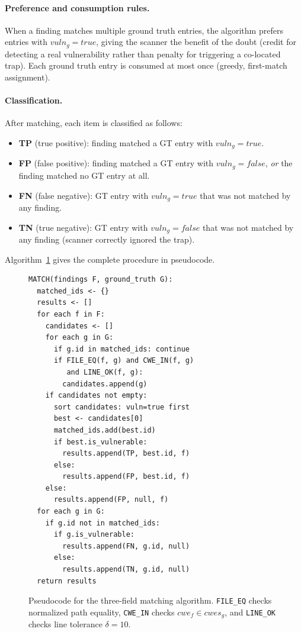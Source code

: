 \paragraph{Preference and consumption rules.}
When a finding matches multiple ground truth entries, the algorithm prefers entries with $\mathit{vuln}_g = \mathit{true}$, giving the scanner the benefit of the doubt (credit for detecting a real vulnerability rather than penalty for triggering a co-located trap).
Each ground truth entry is consumed at most once (greedy, first-match assignment).

\paragraph{Classification.}
After matching, each item is classified as follows:
\begin{itemize}
  \item \textbf{TP} (true positive): finding matched a GT entry with $\mathit{vuln}_g = \mathit{true}$.
  \item \textbf{FP} (false positive): finding matched a GT entry with $\mathit{vuln}_g = \mathit{false}$, \emph{or} the finding matched no GT entry at all.
  \item \textbf{FN} (false negative): GT entry with $\mathit{vuln}_g = \mathit{true}$ that was not matched by any finding.
  \item \textbf{TN} (true negative): GT entry with $\mathit{vuln}_g = \mathit{false}$ that was not matched by any finding (scanner correctly ignored the trap).
\end{itemize}

\noindent
Algorithm~\ref{alg:matching} gives the complete procedure in pseudocode.

\begin{figure}[t]
\small
\begin{verbatim}
MATCH(findings F, ground_truth G):
  matched_ids <- {}
  results <- []
  for each f in F:
    candidates <- []
    for each g in G:
      if g.id in matched_ids: continue
      if FILE_EQ(f, g) and CWE_IN(f, g)
         and LINE_OK(f, g):
        candidates.append(g)
    if candidates not empty:
      sort candidates: vuln=true first
      best <- candidates[0]
      matched_ids.add(best.id)
      if best.is_vulnerable:
        results.append(TP, best.id, f)
      else:
        results.append(FP, best.id, f)
    else:
      results.append(FP, null, f)
  for each g in G:
    if g.id not in matched_ids:
      if g.is_vulnerable:
        results.append(FN, g.id, null)
      else:
        results.append(TN, g.id, null)
  return results
\end{verbatim}
\caption{Pseudocode for the three-field matching algorithm. \texttt{FILE\_EQ} checks normalized path equality, \texttt{CWE\_IN} checks $\mathit{cwe}_f \in \mathit{cwes}_g$, and \texttt{LINE\_OK} checks line tolerance $\delta=10$.}
\label{alg:matching}
\end{figure}

